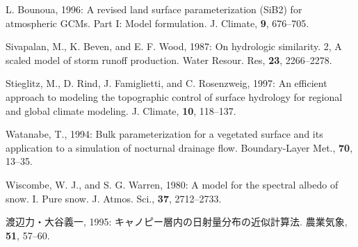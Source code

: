 \begin{description}
	    L. Bounoua, 1996: A revised land surface parameterization
	    (SiB2) for atmospheric GCMs. Part I: Model formulation.
	    {J. Climate}, {\bf 9}, 676--705.
 \item[] Sivapalan, M., K. Beven, and E. F. Wood, 1987: On hydrologic
	    similarity. 2, A scaled model of storm runoff
	    production. {Water Resour. Res}, {\bf 23}, 2266--2278.
 \item[] Stieglitz, M., D. Rind, J. Famiglietti, and C. Rosenzweig,
	    1997: An efficient approach to modeling the topographic
	    control of surface hydrology for regional and global climate
	    modeling. {J. Climate}, {\bf 10}, 118--137.
 \item[] Watanabe, T., 1994: Bulk parameterization for a vegetated
	    surface and its application to a simulation of nocturnal
	    drainage flow. {Boundary-Layer Met.}, {\bf 70}, 13--35.
 \item[] Wiscombe, W. J., and S. G. Warren, 1980: A model for the
	    spectral albedo of snow. I. Pure snow. {J. Atmos. Sci.},
	    {\bf 37}, 2712--2733.
 \item[] 渡辺力・大谷義一, 1995: キャノピー層内の日射量分布の近似計算法.
	    {農業気象}, {\bf 51}, 57--60.
\end{description}
